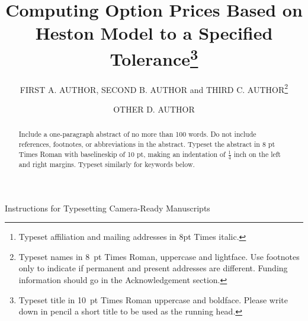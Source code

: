 \documentclass{ws-ijfe}
\begin{document}
{Instructions for Typesetting Camera-Ready Manuscripts}

\catchline{}{}{}{}{}

\title{Computing Option Prices Based on Heston Model to a Specified Tolerance\footnote{Typeset title in
10~pt Times Roman uppercase and boldface. Please write
down in pencil a short title to be used as the running head.}}

\author{FIRST A. AUTHOR, SECOND B. AUTHOR and THIRD
C. AUTHOR\footnote{Typeset names in 8~pt Times Roman, uppercase
and lightface.  Use footnotes only to indicate if permanent and
present addresses are different. Funding information should go
in the Acknowledgement section.}}

\address{Full affiliations\footnote{Typeset
affiliation and mailing addresses in 8pt Times italic.} \\
,mailing addresses and telephone number}

\author{OTHER D. AUTHOR}

\address{Full affiliations \\
,mailing addresses and telephone number}

\maketitle

\begin{abstract}
Include a one-paragraph abstract of no more than 100 words. Do not include references, footnotes, or abbreviations in the abstract. Typeset the
abstract in 8 pt Times Roman with baselineskip of 10 pt, making
an indentation of $\frac14$ inch on the left and right margins.
Typeset similarly for keywords below.
\end{abstract}

\end{document}
